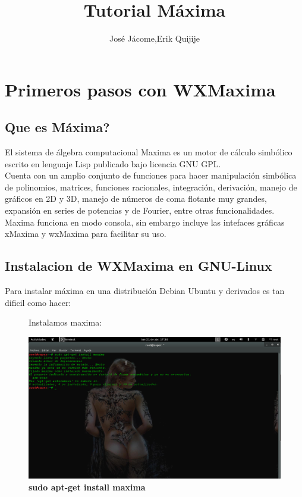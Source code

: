 \documentclass[10pt,a4paper]{book}
\author{José Jácome,Erik Quijije}
\title{Tutorial Máxima}
\begin{document}
\chapter{Primeros pasos con WXMaxima}
\section{Que es Máxima?}
\begin{small}
El sistema de álgebra computacional Maxima es un motor de cálculo simbólico escrito en lenguaje Lisp publicado bajo licencia GNU GPL.\\
Cuenta con un amplio conjunto de funciones para hacer manipulación simbólica de polinomios, matrices, funciones racionales, integración, derivación, manejo de gráficos en 2D y 3D, manejo de números de coma flotante muy grandes, expansión en series de potencias y de Fourier, entre otras funcionalidades.\\
Maxima funciona en modo consola, sin embargo incluye las intefaces gráficas xMaxima y wxMaxima para facilitar su uso.\\
\section{Instalacion de WXMaxima en GNU-Linux}
Para instalar máxima en una distribución Debian Ubuntu y derivados es tan dificil como hacer:\\
\begin{enumerate}

\begin{figure}[htb]
\item Instalamos maxima:\\
\begin{center}
\includegraphics[width=13cm]{fotos/cap2}
\caption{\textbf{sudo apt-get install maxima}}
\end{center}
\end{figure}



\end{enumerate}
\end{small}
\end{document}
